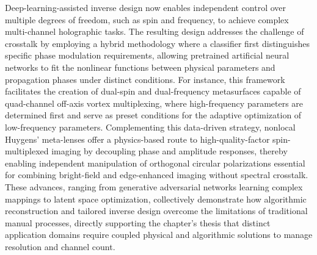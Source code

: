 \documentclass[11pt]{article}
\begin{document}
Deep-learning-assisted inverse design now enables independent control over multiple degrees of freedom, such as spin and frequency, to achieve complex multi-channel holographic tasks. The resulting design addresses the challenge of crosstalk by employing a hybrid methodology where a classifier first distinguishes specific phase modulation requirements, allowing pretrained artificial neural networks to fit the nonlinear functions between physical parameters and propagation phases under distinct conditions. For instance, this framework facilitates the creation of dual-spin and dual-frequency metasurfaces capable of quad-channel off-axis vortex multiplexing, where high-frequency parameters are determined first and serve as preset conditions for the adaptive optimization of low-frequency parameters. Complementing this data-driven strategy, nonlocal Huygens' meta-lenses offer a physics-based route to high-quality-factor spin-multiplexed imaging by decoupling phase and amplitude responses, thereby enabling independent manipulation of orthogonal circular polarizations essential for combining bright-field and edge-enhanced imaging without spectral crosstalk. These advances, ranging from generative adversarial networks learning complex mappings to latent space optimization, collectively demonstrate how algorithmic reconstruction and tailored inverse design overcome the limitations of traditional manual processes, directly supporting the chapter's thesis that distinct application domains require coupled physical and algorithmic solutions to manage resolution and channel count. \citep{doi_10_1117_1_apn_2_1_016010_57069347} \citep{doi_10_1038_s41377_024_01728_3_7dbdfab0} \citep{doi_10_3390_photonics12100947_b44bdefd}
\end{document}

